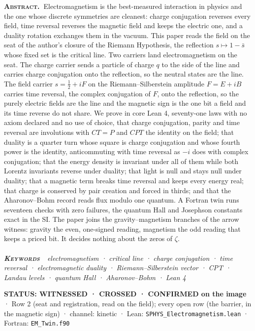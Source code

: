 \documentclass[10pt]{article}
\renewenvironment{quote}{\par\smallskip\noindent\small\color{deep}}{\par\smallskip}
\begin{document}
{\small\noindent\textbf{\scshape\color{deep}Abstract.\ }Electromagnetism
is the best-measured interaction in physics and the one whose discrete
symmetries are cleanest: charge conjugation reverses every field, time
reversal reverses the magnetic field and keeps the electric one, and a
duality rotation exchanges them in the vacuum. This paper reads the
field on the seat of the author's closure of the Riemann Hypothesis, the
reflection \(s\mapsto1-\bar s\) whose fixed set is the critical line.
Two carriers land electromagnetism on the seat. The charge carrier sends
a particle of charge \(q\) to the side of the line and carries charge
conjugation onto the reflection, so the neutral states are the line. The
field carrier \(s=\tfrac12+iF\) on the Riemann--Silberstein amplitude
\(F=E+iB\) carries time reversal, the complex conjugation of \(F\), onto
the reflection, so the purely electric fields are the line and the
magnetic sign is the one bit a field and its time reverse do not share.
We prove in core Lean 4, seventy-one laws with no axiom declared and no
use of choice, that charge conjugation, parity and time reversal are
involutions with \(CT=P\) and \(CPT\) the identity on the field; that
duality is a quarter turn whose square is charge conjugation and whose
fourth power is the identity, anticommuting with time reversal as \(-i\)
does with complex conjugation; that the energy density is invariant
under all of them while both Lorentz invariants reverse under duality;
that light is null and stays null under duality; that a magnetic term
breaks time reversal and keeps every energy real; that charge is
conserved by pair creation and forced in thirds; and that the
Aharonov--Bohm record reads flux modulo one quantum. A Fortran twin runs
seventeen checks with zero failures, the quantum Hall and Josephson
constants exact in the SI. The paper joins the gravity--magnetism
branches of the arrow witness: gravity the even, one-signed reading,
magnetism the odd reading that keeps a priced bit. It decides nothing
about the zeros of \(\zeta\).}\\[-2pt]
\noindent{\color{accent}\rule{\textwidth}{0.6pt}}\\[1pt]
{\itshape\footnotesize\color{faint}\noindent\textbf{\upshape\scshape\color{deep}Keywords\ }\ electromagnetism
· critical line · charge conjugation · time reversal · electromagnetic
duality · Riemann--Silberstein vector · CPT · Landau levels · quantum
Hall · Aharonov--Bohm · Lean 4}\par\vspace{8pt}
\thispagestyle{fancy}
\begin{quote}
\textbf{STATUS: WITNESSED · CROSSED · CONFIRMED on the image} · Row 2
(seat and registration, read on the field); every open row (the barrier,
in the magnetic sign) · channel: kinetic · Lean:
\texttt{SPHYS\_Electromagnetism.lean} · Fortran: \texttt{EM\_Twin.f90}
\end{quote}
\end{document}
